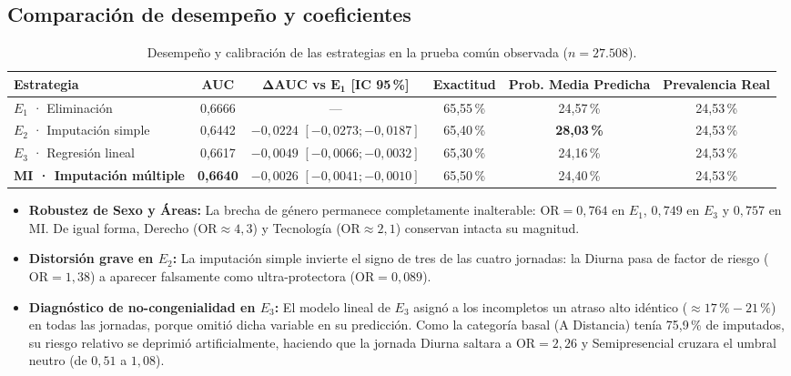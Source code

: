 \documentclass[11pt,a4paper]{article}
\begin{document}
\subsection{Comparación de desempeño y coeficientes}

\begin{table}[h!]
\centering
\small
\caption{Desempeño y calibración de las estrategias en la prueba común observada ($n=27.508$).}
\begin{tabular}{lccccc}
\toprule
\textbf{Estrategia} & \textbf{AUC} & $\mathbf{\Delta\text{AUC}}$ \textbf{vs} $\mathbf{E_1}$ \textbf{[IC 95\,\%]} & \textbf{Exactitud} & \textbf{Prob. Media Predicha} & \textbf{Prevalencia Real} \\
\midrule
$E_1$ · Eliminación & 0,6666 & — & 65,55\,\% & 24,57\,\% & 24,53\,\% \\
$E_2$ · Imputación simple & 0,6442 & $-0,0224$ $[-0,0273; -0,0187]$ & 65,40\,\% & \textbf{28,03\,\%} & 24,53\,\% \\
$E_3$ · Regresión lineal & 0,6617 & $-0,0049$ $[-0,0066; -0,0032]$ & 65,30\,\% & 24,16\,\% & 24,53\,\% \\
\textbf{MI · Imputación múltiple} & \textbf{0,6640} & $-0,0026$ $[-0,0041; -0,0010]$ & 65,50\,\% & 24,40\,\% & 24,53\,\% \\
\bottomrule
\end{tabular}
\end{table}

\begin{itemize}[leftmargin=*]
\item \textbf{Robustez de Sexo y Áreas:} La brecha de género permanece completamente inalterable: $\text{OR} = 0,764$ en $E_1$, $0,749$ en $E_3$ y $0,757$ en MI. De igual forma, Derecho ($\text{OR} \approx 4,3$) y Tecnología ($\text{OR} \approx 2,1$) conservan intacta su magnitud.
\item \textbf{Distorsión grave en $E_2$:} La imputación simple invierte el signo de tres de las cuatro jornadas: la Diurna pasa de factor de riesgo ($\text{OR} = 1,38$) a aparecer falsamente como ultra-protectora ($\text{OR} = 0,089$).
\item \textbf{Diagnóstico de no-congenialidad en $E_3$:} El modelo lineal de $E_3$ asignó a los incompletos un atraso alto idéntico ($\approx 17\,\% - 21\,\%$) en todas las jornadas, porque omitió dicha variable en su predicción. Como la categoría basal (A Distancia) tenía 75,9\,\% de imputados, su riesgo relativo se deprimió artificialmente, haciendo que la jornada Diurna saltara a $\text{OR} = 2,26$ y Semipresencial cruzara el umbral neutro (de $0,51$ a $1,08$).
\end{itemize}
\end{document}
